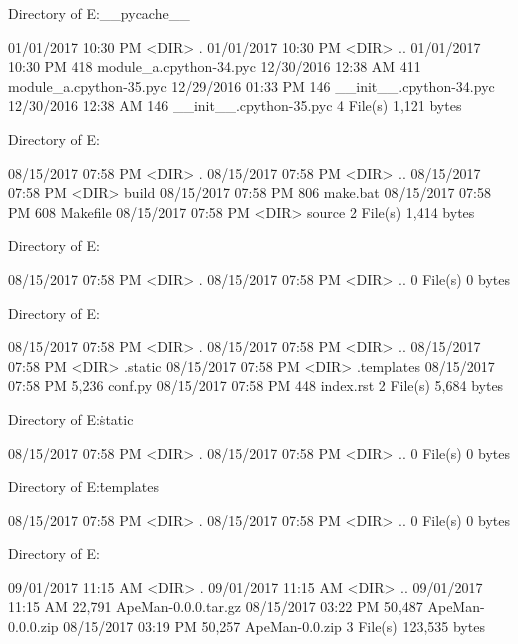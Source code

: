  Directory of E:\Python\apeman\complex\tiers\__pycache__

01/01/2017  10:30 PM    <DIR>          .
01/01/2017  10:30 PM    <DIR>          ..
01/01/2017  10:30 PM               418 module_a.cpython-34.pyc
12/30/2016  12:38 AM               411 module_a.cpython-35.pyc
12/29/2016  01:33 PM               146 __init__.cpython-34.pyc
12/30/2016  12:38 AM               146 __init__.cpython-35.pyc
               4 File(s)          1,121 bytes

 Directory of E:\Python\apeman\delete

08/15/2017  07:58 PM    <DIR>          .
08/15/2017  07:58 PM    <DIR>          ..
08/15/2017  07:58 PM    <DIR>          build
08/15/2017  07:58 PM               806 make.bat
08/15/2017  07:58 PM               608 Makefile
08/15/2017  07:58 PM    <DIR>          source
               2 File(s)          1,414 bytes

 Directory of E:\Python\apeman\delete\build

08/15/2017  07:58 PM    <DIR>          .
08/15/2017  07:58 PM    <DIR>          ..
               0 File(s)              0 bytes

 Directory of E:\Python\apeman\delete\source

08/15/2017  07:58 PM    <DIR>          .
08/15/2017  07:58 PM    <DIR>          ..
08/15/2017  07:58 PM    <DIR>          .static
08/15/2017  07:58 PM    <DIR>          .templates
08/15/2017  07:58 PM             5,236 conf.py
08/15/2017  07:58 PM               448 index.rst
               2 File(s)          5,684 bytes

 Directory of E:\Python\apeman\delete\source\.static

08/15/2017  07:58 PM    <DIR>          .
08/15/2017  07:58 PM    <DIR>          ..
               0 File(s)              0 bytes

 Directory of E:\Python\apeman\delete\source\.templates

08/15/2017  07:58 PM    <DIR>          .
08/15/2017  07:58 PM    <DIR>          ..
               0 File(s)              0 bytes

 Directory of E:\Python\apeman\dist

09/01/2017  11:15 AM    <DIR>          .
09/01/2017  11:15 AM    <DIR>          ..
09/01/2017  11:15 AM            22,791 ApeMan-0.0.0.tar.gz
08/15/2017  03:22 PM            50,487 ApeMan-0.0.0.zip
08/15/2017  03:19 PM            50,257 ApeMan-0.0.zip
               3 File(s)        123,535 bytes

